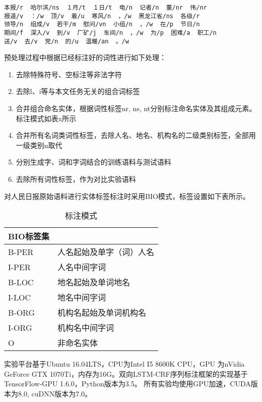 \begin{verbatim}
本报/r  哈尔滨/ns  １月/t  １日/t  电/n  记者/n  董/nr  伟/nr
报道/v  ：/w  顶/v  着/u  寒风/n  ，/w  黑龙江省/ns  各级/r
领导/n  组成/v  若干/m  慰问/vn  小组/n  ，/w  在/p  节日/n
期间/f  深入/v  到/v  厂矿/j  车间/n  ，/w  为/p  困难/a  职工/n
送/v  去/v  党/n  的/u  温暖/an  。/w
\end{verbatim}

预处理过程中根据已经标注好的词性进行如下处理：
\begin{enumerate}
    \item 去除特殊符号、空标注等非法字符
    \item 去除l、i等与本文任务无关的组合词标签
    \item 合并组合命名实体，根据词性标签nr, ns, nt分别标注命名实体及其组成元素。标注模式如表x所示
    \item 合并所有名词类词性标签，去除人名、地名、机构名的二级类别标签，全部用一级类别n取代
    \item 分别生成字、词和字词结合的训练语料与测试语料
    \item 去除所有词性标签，作为对比实验语料
\end{enumerate}

对人民日报原始语料进行实体标签标注时采用BIO模式，标签设置如下表所示。

\begin{table}[H]
    \centering
    \caption{标注模式}
    \begin{tabular}{ll}
        \toprule
            BIO标签集\\
        \midrule
        B-PER & 人名起始及单字（词）人名 \\
        I-PER & 人名中间字词 \\
        B-LOC & 地名起始及单词地名 \\
        I-LOC & 地名中间字词 \\
        B-ORG & 机构名起始及单词机构名 \\
        I-ORG & 机构名中间字词 \\
        O & 非命名实体\\
        \bottomrule
    \end{tabular}
\end{table}

实验平台基于Ubuntu 16.04LTS，CPU为Intel I5 8600K CPU，GPU 为nVidia GeForce GTX 1070Ti，内存为16G。双向LSTM-CRF序列标注框架的实现基于TensorFlow-GPU 1.6.0，Python版本为3.5。
所有实验均使用GPU加速，CUDA版本为8.0, cuDNN版本为7.0。

